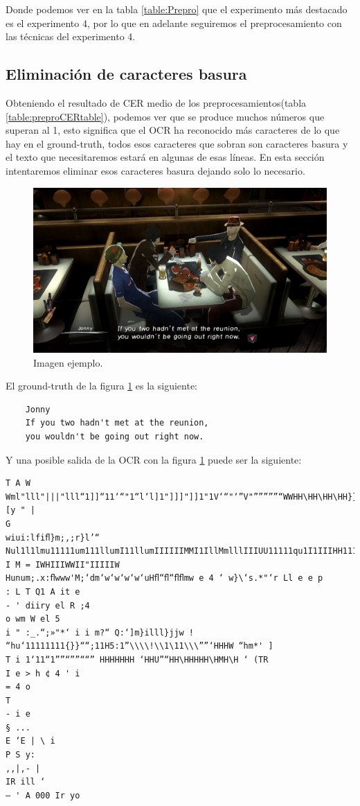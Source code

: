 Donde podemos ver en la tabla \ref{table:Prepro} que el experimento más destacado es el experimento 4, por lo que en adelante seguiremos el preprocesamiento con las técnicas del experimento 4.
\subsection{Eliminación de caracteres basura}
\label{subsec:Eliminación de caracter basura}
Obteniendo el resultado de CER medio de los preprocesamientos(tabla \ref{table:preproCERtable}), podemos ver que se produce muchos números que superan al 1, esto significa que el OCR ha reconocido más caracteres de lo que hay en el ground-truth, todos esos caracteres que sobran son caracteres basura y el texto que necesitaremos estará en algunas de esas líneas. En esta sección intentaremos eliminar esos caracteres basura dejando solo lo necesario.
\begin{figure}[H]
	\centering
	\includegraphics[width = 1\textwidth]{Imagenes/Sample_Trash_Char.png}
	\caption{Imagen ejemplo.}
	\label{fig:Trash_Char}
\end{figure}

El ground-truth de la figura \ref{fig:Trash_Char} es la siguiente:
\begin{verbatim}
	Jonny
	If you two hadn't met at the reunion,
	you wouldn't be going out right now.
\end{verbatim}
Y una posible salida de la OCR con la figura \ref{fig:Trash_Char} puede ser la siguiente:
\begin{verbatim}
T A W
Wml"lll"|||"lll“1]]“11‘“"1“l‘l]1"]]]"]]1"1V‘“"‘”V"”””””“WWHH\HH\HH\HH}}}}111111111”‘””}"“H‘H”H‘mwwmm‘ [y " |
G
wiui:lfiﬂ}m;,;r}l’“
Nul1l1lmu11111um111llumI11llumIIIIIIMMI1IllMmlllIIIUU11111qu1I1IIIHH111111HMIIIIIIMMIII1llMMIIIIIIIIII11IIIIIIIIIIIIIIIIIIIIIII1HmIIIIIMIMIIII1“MIIIIIIIIIIII11||m"||11IIMMIIlll“i“1IIIIIMMllllilﬂU‘Wl“i“ii111HM11111IIUIiiiii“i“ii11IIIIIIIIIIIIIIIIIIIIIIII:“‘ I M = IWHIIIWWII"IIIIIW
Hunum;.x:ﬂwww'M;‘dm‘w‘w‘w‘w‘uHﬂ“ﬂ“ﬂﬂmw e 4 ‘ w}\‘s.*"‘r Ll e e p
: L T Q1 A it e
- ' diiry el R ;4
o wm W el 5
i " :_.“;»"*‘ i i m?“ Q:‘]m}illl}jjw ! “hu‘11111111{}}““;11H5:1”\\\\!\\1\11\\\””‘HHHW “hm*' ]
T i 1‘11“1””“””““” HHHHHHH ‘HHU”“HH\HHHHH\HMH\H ‘ (TR
I e > h ¢ 4 ' i
= 4 o
T
- i e
§ ...
E ‘E | \ i
P S y:
,,|,- |
IR ill ‘
— ' A 000 Ir yo
\end{verbatim}

